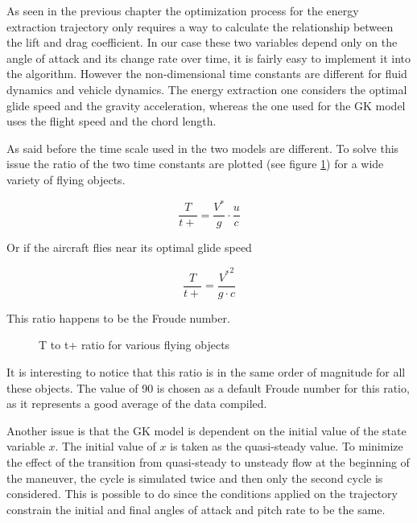 \par As seen in the previous chapter the optimization process for the energy extraction trajectory only requires a way to calculate the relationship between the lift and drag coefficient.
In our case these two variables depend only on the angle of attack and its change rate over time, it is fairly easy to implement it into the algorithm.
However the non-dimensional time constants are different for fluid dynamics and vehicle dynamics.
The energy extraction one considers the optimal glide speed and the gravity acceleration, whereas the one used for the GK model uses the flight speed and the chord length.

As said before the time scale used in the two models are different.
To solve this issue the ratio of the two time constants are plotted (see figure \ref{fig:T_t+_ratio}) for a wide variety of flying objects.

\begin{equation}
  \frac{T}{t+}=\frac{V^*}{g} \cdot \frac{u}{c}
  \label{eqn:T_t+}
\end{equation}

Or if the aircraft flies near its optimal glide speed

\begin{equation}
  \frac{T}{t+}=\frac{{V^*}^2}{g \cdot c}
  \label{eqn:T_t+_ratio}
\end{equation}

This ratio happens to be the Froude number.

\begin{figure}[ht]
  \begin{center}
  \end{center}
  \caption{T to t+ ratio for various flying objects}
  \label{fig:T_t+_ratio}
\end{figure}

\par It is interesting to notice that this ratio is in the same order of magnitude for all these objects.
The value of 90 is chosen as a default Froude number for this ratio, as it represents a good average of the data compiled.

\par Another issue is that the GK model is dependent on the initial value of the state variable $x$.
The initial value of $x$ is taken as the quasi-steady value.
To minimize the effect of the transition from quasi-steady to unsteady flow at the beginning of the maneuver, the cycle is simulated twice and then only the second cycle is considered.
This is possible to do since the conditions applied on the trajectory constrain the initial and final angles of attack and pitch rate to be the same.

